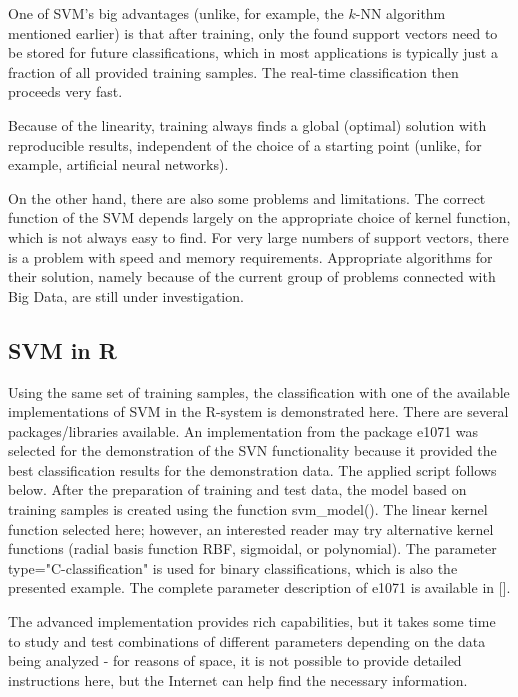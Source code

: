 One of SVM's big advantages (unlike, for example, the $k$-NN algorithm mentioned earlier) is that after training, only the found support vectors need to be stored for future classifications, which in most applications is typically just a fraction of all provided training samples. The real-time classification then proceeds very fast.

Because of the linearity, training always finds a global (optimal) solution with reproducible results, independent of the choice of a starting point (unlike, for example, artificial neural networks).

On the other hand, there are also some problems and limitations. The correct function of the SVM depends largely on the appropriate choice of kernel function, which is not always easy to find. For very large numbers of support vectors, there\\
is a problem with speed and memory requirements. Appropriate algorithms for their solution, namely because of the current group of problems connected with Big Data, are still under investigation.

\subsection{SVM in R}
Using the same set of training samples, the classification with one of the available implementations of SVM in the R-system is demonstrated here. There are several packages/libraries available. An implementation from the package e1071 was selected for the demonstration of the SVN functionality because it provided the best classification results for the demonstration data. The applied script follows below. After the preparation of training and test data, the model based on training samples is created using the function svm\_model(). The linear kernel function selected here; however, an interested reader may try alternative kernel functions (radial basis function RBF, sigmoidal, or polynomial). The parameter type="C-classification" is used for binary classifications, which is also the presented example. The complete parameter description of e1071 is available in [\cite{ref193}].

The advanced implementation provides rich capabilities, but it takes some time to study and test combinations of different parameters depending on the data being analyzed - for reasons of space, it is not possible to provide detailed instructions here, but the Internet can help find the necessary information.

